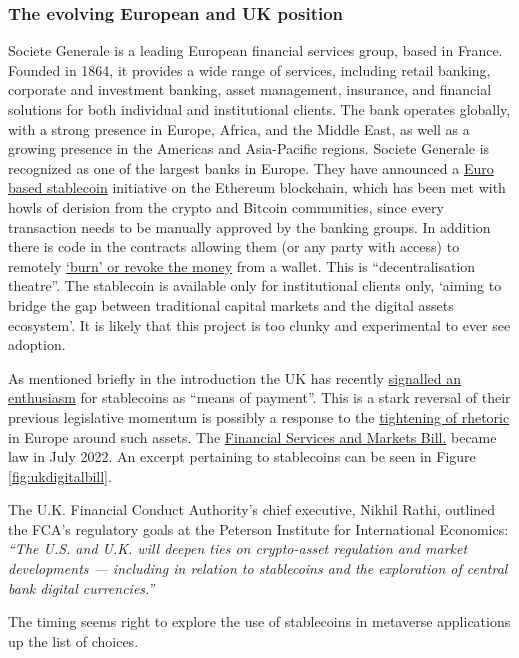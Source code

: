 \subsubsection{The evolving European and UK position}
Societe Generale is a leading European financial services group, based in France. Founded in 1864, it provides a wide range of services, including retail banking, corporate and investment banking, asset management, insurance, and financial solutions for both individual and institutional clients. The bank operates globally, with a strong presence in Europe, Africa, and the Middle East, as well as a growing presence in the Americas and Asia-Pacific regions. Societe Generale is recognized as one of the largest banks in Europe. They have announced a \href{https://www.sgforge.com/societe-generale-forge-launches-coinvertible-the-first-institutional-stablecoin-deployed-on-a-public-blockchain/}{Euro based stablecoin} initiative on the Ethereum blockchain, which has been met with howls of derision from the crypto and Bitcoin communities, since every transaction needs to be manually approved by the banking groups. In addition there is code in the contracts allowing them (or any party with access) to remotely \href{https://etherscan.io/address/0xf7790914dc335b20aa19d7c9c9171e14e278a134#code}{`burn' or revoke the money} from a wallet. This is ``decentralisation theatre''. The stablecoin is available only for institutional clients only, `aiming to bridge the gap between traditional capital markets and the digital assets ecosystem'. It is likely that this project is too clunky and experimental to ever see adoption.\par 
As mentioned briefly in the introduction the UK has recently \href{https://www.gov.uk/government/news/government-sets-out-plan-to-make-uk-a-global-cryptoasset-technology-hub}{signalled an enthusiasm} for stablecoins as ``means of payment''. This is a stark reversal of their previous legislative momentum is possibly a response to the \href{https://www.coindesk.com/policy/2022/05/11/eu-commission-favors-ban-on-large-scale-stablecoins-document-shows/}{tightening of rhetoric} in Europe around such assets. The \href{https://publications.parliament.uk/pa/bills/cbill/58-03/0146/220146.pdf}{Financial Services and Markets Bill.} became law in July 2022. An excerpt pertaining to stablecoins can be seen in Figure \ref{fig:ukdigitalbill}. \par
The U.K. Financial Conduct Authority’s chief executive, Nikhil Rathi, outlined the FCA’s regulatory goals at the Peterson Institute for International Economics: \textit{``The U.S. and U.K. will deepen ties on crypto-asset regulation and market developments — including in relation to stablecoins and the exploration of central bank digital currencies.''} \par
The timing seems right to explore the use of stablecoins in metaverse applications up the list of choices. 

